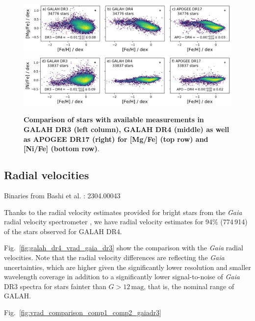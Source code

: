 \documentclass[
  journal=pasa,
  manuscript=research-paper, %
  year=2024,
  volume=37
]{cup-journal}
\newcommand{\Gaia}{\textit{Gaia}\xspace}
\begin{document}
\begin{figure}
 \centering
 \includegraphics[width=\textwidth]{figures/comparison_dr4_dr3_apo17_Mg_fe.png}
 \includegraphics[width=\textwidth]{figures/comparison_dr4_dr3_apo17_Ni_fe.png}
 \caption{\textbf{Comparison of stars with available measurements in GALAH DR3 (left column), GALAH DR4 (middle) as well as APOGEE DR17 (right) for [Mg/Fe] (top row) and [Ni/Fe] (bottom row)}.}
 \label{fig:comparison_dr4_dr3_apo17}
\end{figure}

\subsection{Radial velocities} \label{sec:rv_comparison}

Binaries from Bashi et al. : 2304.00043 \citep{Bashi2023}

Thanks to the radial velocity estimates provided for bright stars from the \Gaia radial velocity spectrometer \citep{Katz2023}, we have radial velocity estimates for 94\% (774\,914) of the stars observed for GALAH DR4.

Fig.~\ref{fig:galah_dr4_vrad_gaia_dr3} show the comparison with the \Gaia radial velocities. Note that the radial velocity differences are reflecting the \Gaia uncertainties, which are higher given the significantly lower resolution and smaller wavelength coverage in addition to a significantly lower signal-to-noise of \Gaia DR3 spectra for stars fainter than $G > 12\,\mathrm{mag}$, that is, the nominal range of GALAH.



Fig.~\ref{fig:vrad_comparison_comp1_comp2_gaiadr3}
\end{document}

